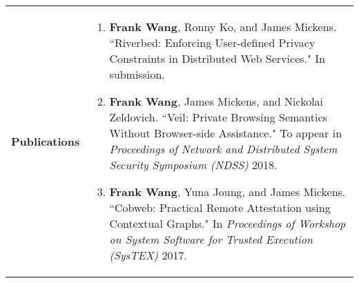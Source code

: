 \documentclass[a4paper,10pt]{article}
\begin{document}
\begin{longtable}{ p{0.9in} l }

\textbf{Publications} & \begin{minipage}[t]{0.78 \textwidth} 
\begin{enumerate}[leftmargin=*]
\setlength{\itemsep}{7pt}
                \setlength{\parskip}{0pt}
                \setlength{\parsep}{0pt}
                
\item{\textbf{Frank Wang}, Ronny Ko, and James Mickens. ``Riverbed: Enforcing User-defined Privacy Constraints in Distributed Web Services." In submission.}

\item{\textbf{Frank Wang}, James Mickens, and Nickolai Zeldovich. ``Veil: Private Browsing Semantics Without Browser-side Assistance." To appear in \textit{Proceedings of Network and Distributed System Security Symposium (NDSS)} 2018.}

\item{\textbf{Frank Wang}, Yuna Joung, and James Mickens. ``Cobweb: Practical Remote Attestation using Contextual Graphs." In \textit{Proceedings of Workshop on System Software for Trusted Execution (SysTEX)} 2017.}


\end{enumerate}
\end{minipage}
\end{longtable}
\end{document}

